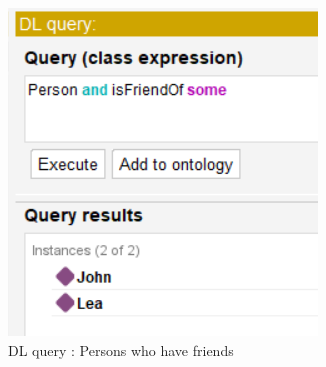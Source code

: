 \begin{figure}[h!]
    \centering
    \begin{minipage}[b]{0.3\textwidth}
        \centering
        \includegraphics[width=\textwidth]{images/1.1 - tuto/DL query.png}
        \caption{DL query : Persons who have friends}
        \label{fig:image1}
    \end{minipage}
    \hfill
    \begin{minipage}[b]{0.3\textwidth}
        \centering

\end{minipage}
\end{figure}
